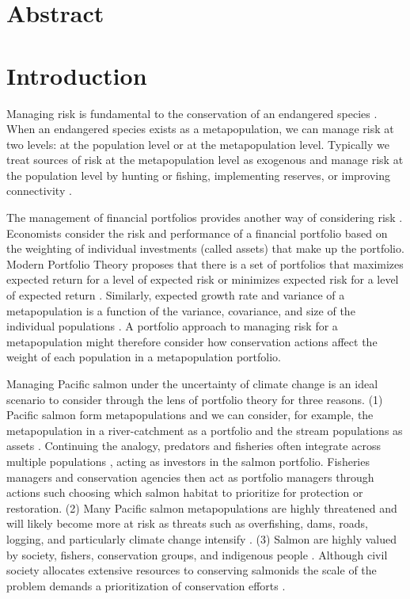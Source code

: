 \section{Abstract}

\section{Introduction}

Managing risk is fundamental to the conservation of an endangered species \citep{burgman2005, iucn2009}. When an endangered species exists as a metapopulation, we can manage risk at two levels: at the population level or at the metapopulation level. Typically we treat sources of risk at the metapopulation level as exogenous and manage risk at the population level by hunting or fishing, implementing reserves, or improving connectivity \citep[e.g.][]{akcakaya2007}.

The management of financial portfolios provides another way of considering risk \citep{figge2004, koellner2006, ando2012}. Economists consider the risk and performance of a financial portfolio based on the weighting of individual investments (called assets) that make up the portfolio. Modern Portfolio Theory proposes that there is a set of portfolios that maximizes expected return for a level of expected risk or minimizes expected risk for a level of expected return \citep{markowitz1952, markowitz1959}. Similarly, expected growth rate and variance of a metapopulation is a function of the variance, covariance, and size of the individual populations \citep{moore2010}. A portfolio approach to managing risk for a metapopulation might therefore consider how conservation actions affect the weight of each population in a metapopulation portfolio.

Managing Pacific salmon under the uncertainty of climate change is an ideal scenario to consider through the lens of portfolio theory for three reasons. (1) Pacific salmon form metapopulations \citep{rieman2000, schtickzelle2007} and we can consider, for example, the metapopulation in a river-catchment as a portfolio and the stream populations as assets \citep{schindler2010, moore2010}. Continuing the analogy, predators and fisheries often integrate across multiple populations \citep{hilborn2003, schindler2008}, acting as investors in the salmon portfolio. Fisheries managers and conservation agencies then act as portfolio managers through actions such choosing which salmon habitat to prioritize for protection or restoration. (2) Many Pacific salmon metapopulations are highly threatened \citep{mcclure2003, gustafson2007, peterman2012} and will likely become more at risk as threats such as overfishing, dams, roads, logging, and particularly climate change intensify \citep[e.g.][]{lackey2003}. (3) Salmon are highly valued by society, fishers, conservation groups, and indigenous people \citep{nrc1996}. Although civil society allocates extensive resources to conserving salmonids the scale of the problem demands a prioritization of conservation efforts \citep{allendorf1997}.

